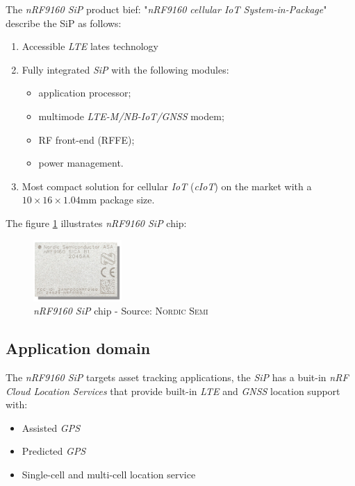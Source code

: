 \documentclass[report.tex]{subfiles}
\begin{document}
The \textit{nRF9160 SiP} product bief: "\textit{nRF9160 cellular IoT System-in-Package}"\cite{nrf9160brief} describe the SiP as follows:
\begin{enumerate}
\item Accessible \textit{LTE} lates technology
\item Fully integrated \textit{SiP} with the following modules:
\begin{itemize}
\item application processor;
\item multimode \textit{LTE-M/NB-IoT/GNSS} modem;
\item RF front-end (RFFE);
\item power management.
\end{itemize}
\item Most compact solution for cellular \textit{IoT} (\textit{cIoT}) on the market with a $10\times 16\times 1.04\si{\milli\meter}$ package size.\\
\end{enumerate}

The figure \ref{fig:nRF9160_SiP_chip} illustrates \textit{nRF9160 SiP}\cite{nrf9160brief} chip:

\begin{figure}[H]
	\centering
	\includegraphics[width=0.3\textwidth]{Include/Figure/Hardware/nRF9160_SiP_chip.png}
	\caption{\textit{nRF9160 SiP} chip - Source: \textsc{Nordic Semi}\cite{nrf9160brief}}
	\label{fig:nRF9160_SiP_chip}
\end{figure}

\subsection{Application domain}

The \textit{nRF9160 SiP}\cite{nrf9160brief} targets asset tracking applications, the \textit{SiP} has a buit-in \textit{nRF Cloud Location Services}\cite{nrfcldlocsrvc} that provide built-in \textit{LTE} and \textit{GNSS} location support with:
\begin{itemize}
\item Assisted \textit{GPS}
\item Predicted \textit{GPS}
\item Single-cell and multi-cell location service
\end{itemize}
\end{document}
